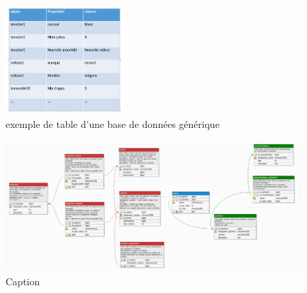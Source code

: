 \begin{figure}[h!]
    \begin{center}
         \includegraphics[width=0.4\textwidth]{images/bd_image2.png}
    \caption{exemple de table d'une base de données générique}
    \label{exemple de table d'une base de données générique}
    \end{center}
\end{figure}



\begin{landscape}
\begin{figure}
   \begin{center}
       \includegraphics[width=1.8\textwidth]{images/bd_image3.jpg}
    \caption{Caption}
    \label{fig:my_label}
   \end{center}
\end{figure}
\end{landscape}

